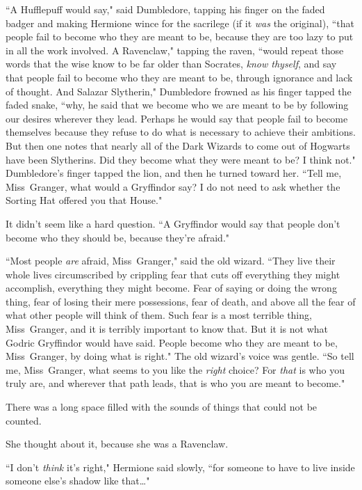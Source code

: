 ``A Hufflepuff would say," said Dumbledore, tapping his finger on the faded badger and making Hermione wince for the sacrilege (if it \emph{was} the original), ``that people fail to become who they are meant to be, because they are too lazy to put in all the work involved. A Ravenclaw," tapping the raven, ``would repeat those words that the wise know to be far older than Socrates, \emph{know thyself}, and say that people fail to become who they are meant to be, through ignorance and lack of thought. And Salazar Slytherin," Dumbledore frowned as his finger tapped the faded snake, ``why, he said that we become who we are meant to be by following our desires wherever they lead. Perhaps he would say that people fail to become themselves because they refuse to do what is necessary to achieve their ambitions. But then one notes that nearly all of the Dark Wizards to come out of Hogwarts have been Slytherins. Did they become what they were meant to be? I think not." Dumbledore's finger tapped the lion, and then he turned toward her. ``Tell me, Miss~Granger, what would a Gryffindor say? I do not need to ask whether the Sorting Hat offered you that House."

It didn't seem like a hard question. ``A Gryffindor would say that people don't become who they should be, because they're afraid."

``Most people \emph{are} afraid, Miss~Granger," said the old wizard. ``They live their whole lives circumscribed by crippling fear that cuts off everything they might accomplish, everything they might become. Fear of saying or doing the wrong thing, fear of losing their mere possessions, fear of death, and above all the fear of what other people will think of them. Such fear is a most terrible thing, Miss~Granger, and it is terribly important to know that. But it is not what Godric Gryffindor would have said. People become who they are meant to be, Miss~Granger, by doing what is right." The old wizard's voice was gentle. ``So tell me, Miss~Granger, what seems to you like the \emph{right} choice? For \emph{that} is who you truly are, and wherever that path leads, that is who you are meant to become."

There was a long space filled with the sounds of things that could not be counted.

She thought about it, because she was a Ravenclaw.

``I don't \emph{think} it's right," Hermione said slowly, ``for someone to have to live inside someone else's shadow like that{\ldots}"

